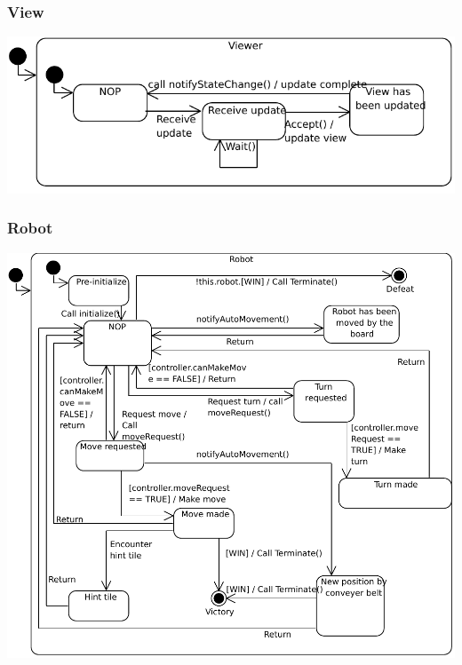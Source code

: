 	\subsubsection{View}
		\includegraphics[width=\linewidth]{statecharts/view.pdf}
	\subsubsection{Robot}
		\includegraphics[width=\linewidth]{statecharts/robot.pdf}

